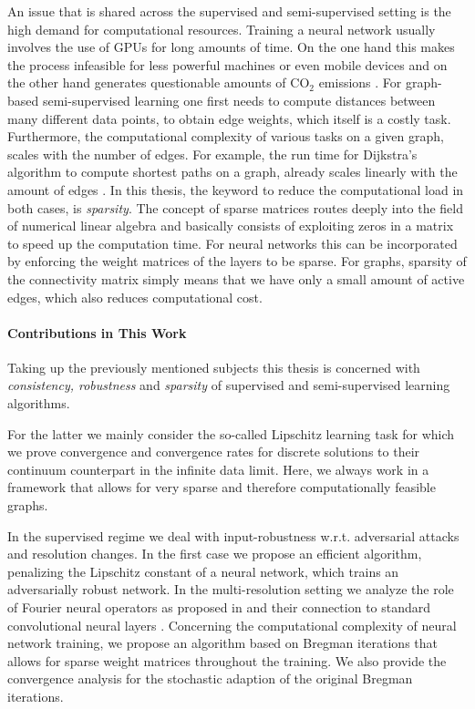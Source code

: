 An issue that is shared across the supervised and semi-supervised setting is the high demand for computational resources. Training a neural network usually involves the use of GPUs for long amounts of time. On the one hand this makes the process infeasible for less powerful machines or even mobile devices and on the other hand generates questionable amounts of $\mathrm{CO_2}$ emissions \cite{hoefler2021sparsity}. For graph-based semi-supervised learning one first needs to compute distances between many different data points, to obtain edge weights, which itself is a costly task. Furthermore, the computational complexity of various tasks on a given graph, scales with the number of edges. For example, the run time for Dijkstra's algorithm to compute shortest paths on a graph, already scales linearly with the amount of edges \cite{dijkstra2022note}. In this thesis, the keyword to reduce the computational load in both cases, is \textit{sparsity}. The concept of sparse matrices routes deeply into the field of numerical linear algebra \cite{lanczos1952solution,golub2013matrix} and basically consists of exploiting zeros in a matrix to speed up the computation time. For neural networks this can be incorporated by enforcing the weight matrices of the layers to be sparse. For graphs, sparsity of the connectivity matrix simply means that we have only a small amount of active edges, which also reduces computational cost.
%
%
\paragraph{Contributions in This Work}
%
Taking up the previously mentioned subjects this thesis is concerned with \textit{consistency, robustness} and \textit{sparsity} of supervised and semi-supervised learning algorithms. 

For the latter we mainly consider the so-called Lipschitz learning task \cite{nadler2009statistical} for which we prove convergence and convergence rates for discrete solutions to their continuum counterpart in the infinite data limit. Here, we always work in a framework that allows for very sparse and therefore computationally feasible graphs.

In the supervised regime we deal with input-robustness w.r.t. adversarial attacks and resolution changes. In the first case we propose an efficient algorithm, penalizing the Lipschitz constant \cite{lipschitz1877lehrbuch} of a neural network, which trains an adversarially robust network. In the multi-resolution setting we analyze the role of Fourier neural operators as proposed in \cite{li2020fourier} and their connection to standard convolutional neural layers \cite{fukushima1980neocognitron}. Concerning the computational complexity of neural network training, we propose an algorithm based on Bregman iterations \cite{osher2005iterative} that allows for sparse weight matrices throughout the training. We also provide the convergence analysis for the stochastic adaption of the original Bregman iterations.

